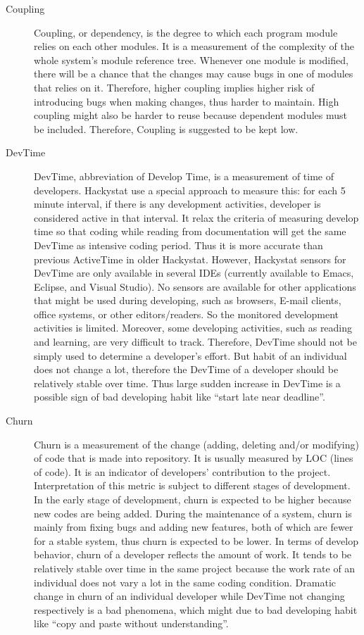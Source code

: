 \begin{description}
\item[Coupling] 
Coupling, or dependency, is the degree to which each program module relies on each other modules. It is a measurement of the complexity of the whole system's module reference tree. Whenever one module is modified, there will be a chance that the changes may cause bugs in one of modules that relies on it. Therefore, higher coupling implies higher risk of introducing bugs when making changes, thus harder to maintain. High coupling might also be harder to reuse because dependent modules must be included. Therefore, Coupling is suggested to be kept low.

\item[DevTime] 
DevTime, abbreviation of Develop Time, is a measurement of time of developers. Hackystat use a special approach to measure this: for each 5 minute interval, if there is any development activities, developer is considered active in that interval. It relax the criteria of measuring develop time so that coding while reading from documentation will get the same DevTime as intensive coding period. Thus it is more accurate than previous ActiveTime in older Hackystat. However, Hackystat sensors for DevTime are only available in several IDEs (currently available to Emacs, Eclipse, and Visual Studio). No sensors are available for other applications that might be used during developing, such as browsers, E-mail clients, office systems, or other editors/readers. So the monitored development activities is limited. Moreover, some developing activities, such as reading and learning, are very difficult to track. Therefore, DevTime should not be simply used to determine a developer's effort. But habit of an individual does not change a lot, therefore the DevTime of a developer should be relatively stable over time. Thus large sudden increase in DevTime is a possible sign of bad developing habit like ``start late near deadline''.

\item[Churn] 
Churn is a measurement of the change (adding, deleting and/or modifying) of code that is made into repository. It is usually measured by LOC (lines of code). It is an indicator of developers' contribution to the project. Interpretation of this metric is subject to different stages of development. In the early stage of development, churn is expected to be higher because new codes are being added. During the maintenance of a system, churn is mainly from fixing bugs and adding new features, both of which are fewer for a stable system, thus churn is expected to be lower. In terms of develop behavior, churn of a developer reflects the amount of work. It tends to be relatively stable over time in the same project because the work rate of an individual does not vary a lot in the same coding condition. Dramatic change in churn of an individual developer while DevTime not changing respectively is a bad phenomena, which might due to bad developing habit like ``copy and paste without understanding''.


\end{description}
